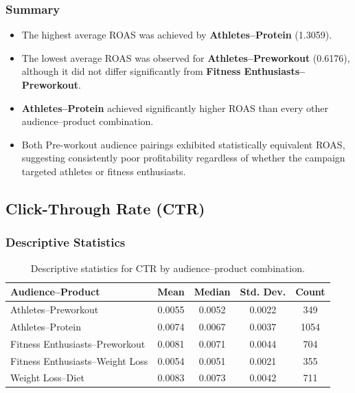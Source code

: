 \subsubsection{Summary}

\begin{itemize}
	\item The highest average ROAS was achieved by \textbf{Athletes--Protein} (1.3059).
	\item The lowest average ROAS was observed for \textbf{Athletes--Preworkout} (0.6176), although it did not differ significantly from \textbf{Fitness Enthusiasts--Preworkout}.
	\item \textbf{Athletes--Protein} achieved significantly higher ROAS than every other audience--product combination.
	\item Both Pre-workout audience pairings exhibited statistically equivalent ROAS, suggesting consistently poor profitability regardless of whether the campaign targeted athletes or fitness enthusiasts.
\end{itemize}



\subsection{Click-Through Rate (CTR)}\label{appendix:audience_product_performance_analysis_CTR}

\subsubsection{Descriptive Statistics}

\begin{table}[H]
	\centering
	\caption{Descriptive statistics for CTR by audience--product combination.}
	\begin{tabular}{lcccc}
		\toprule
		Audience--Product & Mean & Median & Std. Dev. & Count \\
		\midrule
		Athletes--Preworkout & 0.0055 & 0.0052 & 0.0022 & 349 \\
		Athletes--Protein & 0.0074 & 0.0067 & 0.0037 & 1054 \\
		Fitness Enthusiasts--Preworkout & 0.0081 & 0.0071 & 0.0044 & 704 \\
		Fitness Enthusiasts--Weight Loss & 0.0054 & 0.0051 & 0.0021 & 355 \\
		Weight Loss--Diet & 0.0083 & 0.0073 & 0.0042 & 711 \\
		\bottomrule
	\end{tabular}
\end{table}

